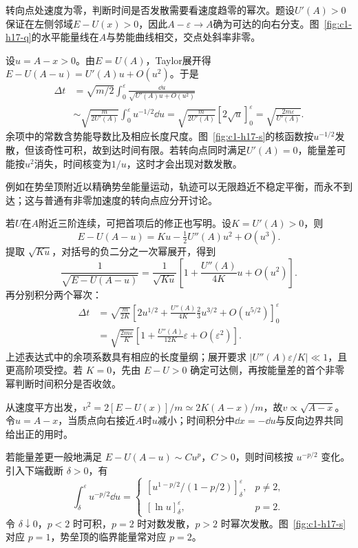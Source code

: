 \begin{solution}
转向点处速度为零，判断时间是否发散需要看速度趋零的幂次。题设$U'(A)>0$保证在左侧邻域$E-U(x)>0$，因此$A-\varepsilon\to A$确为可达的向右分支。图~\ref{fig:c1-h17-q}的水平能量线在$A$与势能曲线相交，交点处斜率非零。


设$u=A-x>0$。由$E=U(A)$，Taylor展开得$E-U(A-u)=U'(A)u+O(u^2)$。于是
\[
\begin{aligned}
\Delta t&=\sqrt{m/2}\int_0^\varepsilon\frac{\dd u}{\sqrt{U'(A)u+O(u^2)}}\\
&\sim\sqrt{\frac{m}{2U'(A)}}\int_0^\varepsilon u^{-1/2}\dd u
=\sqrt{\frac{m}{2U'(A)}}[2\sqrt u]_0^\varepsilon
=\boxed{\sqrt{\frac{2m\varepsilon}{U'(A)}}}.
\end{aligned}
\]
余项中的常数含势能导数比及相应长度尺度。图~\ref{fig:c1-h17-s}的核函数按$u^{-1/2}$发散，但该奇性可积，故到达时间有限。若转向点同时满足$U'(A)=0$，能量差可能按$u^2$消失，时间核变为$1/u$，这时才会出现对数发散。

例如在势垒顶附近以精确势垒能量运动，轨迹可以无限趋近不稳定平衡，而永不到达；这与普通有非零加速度的转向点应分开讨论。


若$U$在$A$附近三阶连续，可把首项后的修正也写明。设$K=U'(A)>0$，则
\[E-U(A-u)=Ku-\tfrac12U''(A)u^2+O(u^3).\]
提取 $\sqrt{Ku}$，对括号的负二分之一次幂展开，得到
\[
\frac1{\sqrt{E-U(A-u)}}
=\frac1{\sqrt{Ku}}\left[1+\frac{U''(A)}{4K}u+O(u^2)\right].
\]
再分别积分两个幂次：
\[
\begin{aligned}
\Delta t&=\sqrt{\frac{m}{2K}}\left[2u^{1/2}+\frac{U''(A)}{4K}\frac23u^{3/2}+O(u^{5/2})\right]_0^\varepsilon\\
&=\sqrt{\frac{2m\varepsilon}{K}}\left[1+\frac{U''(A)}{12K}\varepsilon+O(\varepsilon^2)\right].
\end{aligned}
\]
上述表达式中的余项系数具有相应的长度量纲；展开要求 $|U''(A)\varepsilon/K|\ll1$，且更高阶项受控。若 $K=0$，先由 $E-U>0$ 确定可达侧，再按能量差的首个非零幂判断时间积分是否收敛。

从速度平方出发，$v^2=2[E-U(x)]/m\simeq2K(A-x)/m$，故$v\propto\sqrt{A-x}$。令$u=A-x$，当质点向右接近$A$时$u$减小；时间积分中$\dd x=-\dd u$与反向边界共同给出正的用时。

若能量差更一般地满足 $E-U(A-u)\sim Cu^p$，$C>0$，则时间核按 $u^{-p/2}$ 变化。引入下端截断 $\delta>0$，有
\[
\int_\delta^\varepsilon u^{-p/2}\dd u
=\begin{cases}
\left[u^{1-p/2}/(1-p/2)\right]_\delta^\varepsilon,&p\ne2,\\
[\ln u]_\delta^\varepsilon,&p=2.
\end{cases}
\]
令 $\delta\downarrow0$，$p<2$ 时可积，$p=2$ 时对数发散，$p>2$ 时幂次发散。图~\ref{fig:c1-h17-s}对应 $p=1$，势垒顶的临界能量常对应 $p=2$。


\end{solution}
